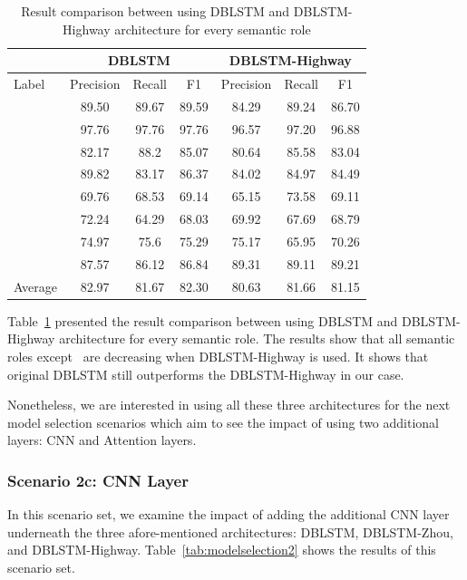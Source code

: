 \begin{table}
	\centering
	\caption{Result comparison between using DBLSTM and DBLSTM-Highway architecture for every semantic role}
	\label{tab:dblstmdblstmhighway}
	\begin{tabular}{|l|ccc|ccc|}
		\hline
		& \multicolumn{3}{c}{ DBLSTM } & \multicolumn{3}{c}{ DBLSTM-Highway } \\
		\hline
		Label & Precision & Recall & F1 & Precision & Recall & F1 \\
		\hline\hline
		\agent & 89.50 & 89.67 & 89.59 & 84.29 & 89.24 & 86.70\\
		\predicate & 97.76 & 97.76 & 97.76 & 96.57 & 97.20 & 96.88\\
		\patient  & 82.17 & 88.2 & 85.07 & 80.64 & 85.58 & 83.04\\
		\modal & 89.82 & 83.17 & 86.37 & 84.02 & 84.97 & 84.49\\
		\beneficiary & 69.76 & 68.53 & 69.14 & 65.15 & 73.58 & 69.11\\
		\location  & 72.24 & 64.29 & 68.03 & 69.92 & 67.69 & 68.79\\
		\greet  & 74.97 & 75.6 & 75.29 & 75.17 & 65.95 & 70.26\\
		\timesrl  & 87.57 & 86.12 & 86.84 & 89.31 & 89.11 & 89.21\\
		\hline
		Average & 82.97 & 81.67 & 82.30 & 80.63 & 81.66 & 81.15\\
		\hline
	\end{tabular}
	
\end{table}

Table~\ref{tab:dblstmdblstmhighway} presented the result comparison between using DBLSTM and DBLSTM-Highway architecture for every semantic role. The results show that all semantic roles except \timesrl~are decreasing when DBLSTM-Highway is used. It shows that original DBLSTM still outperforms the DBLSTM-Highway in our case.

Nonetheless, we are interested in using all these three architectures for the next model selection scenarios which aim to see the impact of using two additional layers: CNN and Attention layers.

\subsubsection{Scenario 2c: CNN Layer}
In this scenario set, we examine the impact of adding the additional CNN layer underneath the three afore-mentioned architectures: DBLSTM, DBLSTM-Zhou, and DBLSTM-Highway. Table~\ref{tab:modelselection2} shows the results of this scenario set.


